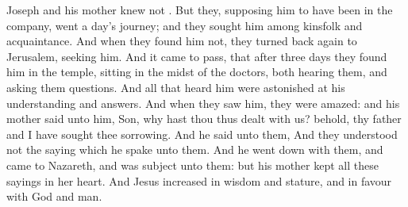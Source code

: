 {Joseph
and
his
mother
knew
not
{}.
But they,
supposing
him to have
been
in the
company,
went a
day’s
journey;
and they
sought
him
among
{}
kinsfolk
and
acquaintance.
And when they
found
him
not, they turned back
again
to
Jerusalem,
seeking
him.
And it came to
pass, that
after
three
days they
found
him
in the
temple,
sitting
in the
midst of the
doctors,
both
hearing
them,
and
asking
them
questions.
And
all that
heard
him were
astonished
at
his
understanding
and
answers.
And when they
saw
him, they were
amazed:
and
his
mother
said
unto
him,
Son,
why hast
thou
thus
dealt with
us?
behold,
thy
father and
I have
sought
thee
sorrowing.
And he
said
unto
them,
{}
And
they
understood
not the
saying
which he
spake unto
them.
And he went
down
with
them,
and
came
to
Nazareth,
and
was subject
unto
them:
but
his
mother
kept
all
these
sayings
in
her
heart.
And
Jesus
increased in
wisdom
and
stature,
and in
favour
with
God
and
man.

}
